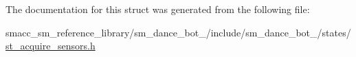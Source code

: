 The documentation for this struct was generated from the following file\+:\begin{DoxyCompactItemize}
\item 
smacc\+\_\+sm\+\_\+reference\+\_\+library/sm\+\_\+dance\+\_\+bot\+\_/include/sm\+\_\+dance\+\_\+bot\+\_/states/\hyperlink{3_2include_2sm__dance__bot__3_2states_2st__acquire__sensors_8h}{st\+\_\+acquire\+\_\+sensors.\+h}\end{DoxyCompactItemize}
